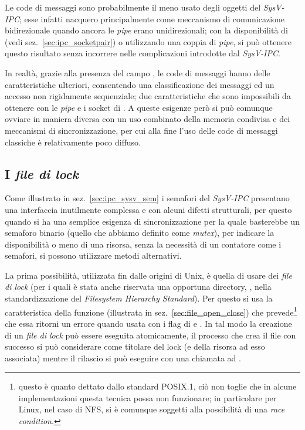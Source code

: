 Le code di messaggi sono probabilmente il meno usato degli oggetti del
\textit{SysV-IPC}; esse infatti nacquero principalmente come meccanismo di
comunicazione bidirezionale quando ancora le \textit{pipe} erano
unidirezionali; con la disponibilità di  (vedi
sez.~\ref{sec:ipc_socketpair}) o utilizzando una coppia di \textit{pipe}, si
può ottenere questo risultato senza incorrere nelle complicazioni introdotte
dal \textit{SysV-IPC}.

In realtà, grazie alla presenza del campo , le code di messaggi
hanno delle caratteristiche ulteriori, consentendo una classificazione dei
messaggi ed un accesso non rigidamente sequenziale; due caratteristiche che
sono impossibili da ottenere con le \textit{pipe} e i socket di
.  A queste esigenze però si può comunque ovviare in maniera
diversa con un uso combinato della memoria condivisa e dei meccanismi di
sincronizzazione, per cui alla fine l'uso delle code di messaggi classiche è
relativamente poco diffuso.



\subsection{I \textsl{file di lock}}
\label{sec:ipc_file_lock}


Come illustrato in sez.~\ref{sec:ipc_sysv_sem} i semafori del \textit{SysV-IPC}
presentano una interfaccia inutilmente complessa e con alcuni difetti
strutturali, per questo quando si ha una semplice esigenza di sincronizzazione
per la quale basterebbe un semaforo binario (quello che abbiamo definito come
\textit{mutex}), per indicare la disponibilità o meno di una risorsa, senza la
necessità di un contatore come i semafori, si possono utilizzare metodi
alternativi.

La prima possibilità, utilizzata fin dalle origini di Unix, è quella di usare
dei \textsl{file di lock} (per i quali è stata anche riservata una opportuna
directory, , nella standardizzazione del \textit{Filesystem
  Hierarchy Standard}). Per questo si usa la caratteristica della funzione
 (illustrata in sez.~\ref{sec:file_open_close}) che
prevede\footnote{questo è quanto dettato dallo standard POSIX.1, ciò non
  toglie che in alcune implementazioni questa tecnica possa non funzionare; in
  particolare per Linux, nel caso di NFS, si è comunque soggetti alla
  possibilità di una \textit{race condition}.} che essa ritorni un errore
quando usata con i flag di  e . In tal modo la
creazione di un \textsl{file di lock} può essere eseguita atomicamente, il
processo che crea il file con successo si può considerare come titolare del
lock (e della risorsa ad esso associata) mentre il rilascio si può eseguire
con una chiamata ad .

